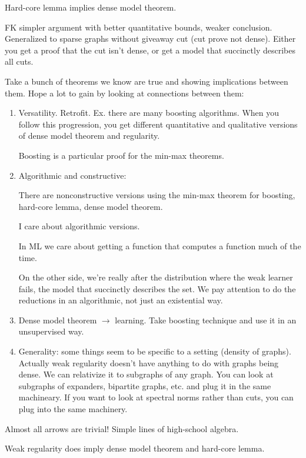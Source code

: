 Hard-core lemma implies dense model theorem.

FK simpler argument with better quantitative bounds, weaker conclusion. Generalized to sparse graphs without giveaway cut (cut prove not dense).
Either you get a proof that the cut isn't dense, or get a model that succinctly describes all cuts.

Take a bunch of theorems we know are true and showing implications between them.
Hope a lot to gain by looking at connections between them:
\begin{enumerate}
\item
Versatility. Retrofit. Ex. there are many boosting algorithms. When you follow this progression, you get different quantitative and qualitative versions of dense model theorem and regularity.


Boosting is a particular proof for the min-max theorems.
\item
Algorithmic and constructive: 

There are nonconstructive versions using the min-max theorem for boosting, hard-core lemma, dense model theorem.

I care about algorithmic versions. 

In ML we care about getting a function that computes a function much of the time. 

On the other side, we're really after the distribution where the weak learner fails, the model that succinctly describes the set. We pay attention to do the reductions in an algorithmic, not just an existential way.
\item
Dense model theorem $\to$ learning. Take boosting technique and use it in an unsupervised way. 
\item
Generality: some things seem to be specific to a setting (density of graphs). Actually weak regularity doesn't have anything to do with graphs being dense. We can relativize it to subgraphs of any graph. You can look at subgraphs of expanders, bipartite graphs, etc. and plug it in the same machineary. If you want to look at spectral norms rather than cuts, you can plug into the same machinery.
\end{enumerate}



Almost all arrows are trivial! Simple lines of high-school algebra.

Weak regularity does imply dense model theorem and hard-core lemma.

